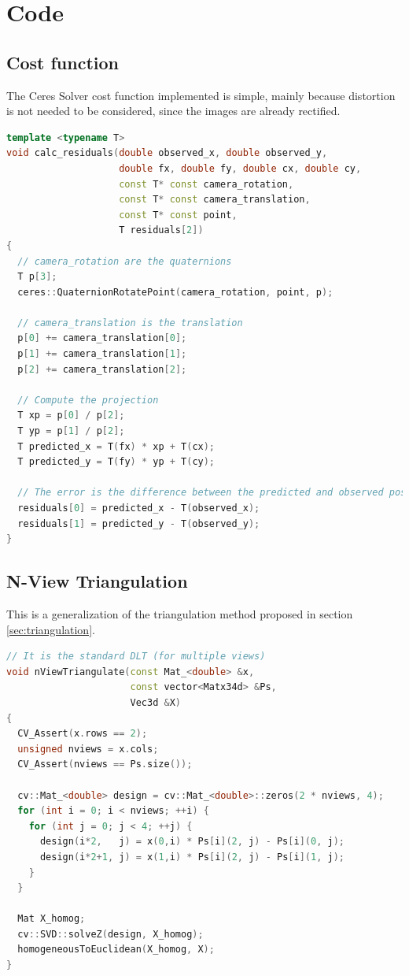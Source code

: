 \newpage
\section{Code}
\subsection{Cost function}
\label{sec:ceres_impl}

The Ceres Solver cost function implemented is simple, mainly because distortion is not needed to be considered, since the images are already rectified.

\begin{lstlisting}[language=C++, label=code:cost_function, caption={Cost function}]
template <typename T>
void calc_residuals(double observed_x, double observed_y,
                    double fx, double fy, double cx, double cy,
                    const T* const camera_rotation,
                    const T* const camera_translation,
                    const T* const point,
                    T residuals[2])
{
  // camera_rotation are the quaternions
  T p[3];
  ceres::QuaternionRotatePoint(camera_rotation, point, p);

  // camera_translation is the translation
  p[0] += camera_translation[0];
  p[1] += camera_translation[1];
  p[2] += camera_translation[2];

  // Compute the projection
  T xp = p[0] / p[2];
  T yp = p[1] / p[2];
  T predicted_x = T(fx) * xp + T(cx);
  T predicted_y = T(fy) * yp + T(cy);

  // The error is the difference between the predicted and observed position.
  residuals[0] = predicted_x - T(observed_x);
  residuals[1] = predicted_y - T(observed_y);
}
\end{lstlisting}



\subsection{N-View Triangulation}
\label{sec:triangulation_impl}

This is a generalization of the triangulation method proposed in section \ref{sec:triangulation}.

\begin{lstlisting}[language=C++, label=code:triangulation, caption={Triangulation}]
// It is the standard DLT (for multiple views)
void nViewTriangulate(const Mat_<double> &x,
                      const vector<Matx34d> &Ps,
                      Vec3d &X)
{
  CV_Assert(x.rows == 2);
  unsigned nviews = x.cols;
  CV_Assert(nviews == Ps.size());

  cv::Mat_<double> design = cv::Mat_<double>::zeros(2 * nviews, 4);
  for (int i = 0; i < nviews; ++i) {
    for (int j = 0; j < 4; ++j) {
      design(i*2,   j) = x(0,i) * Ps[i](2, j) - Ps[i](0, j);
      design(i*2+1, j) = x(1,i) * Ps[i](2, j) - Ps[i](1, j);
    }
  }

  Mat X_homog;
  cv::SVD::solveZ(design, X_homog);
  homogeneousToEuclidean(X_homog, X);
}
\end{lstlisting}

